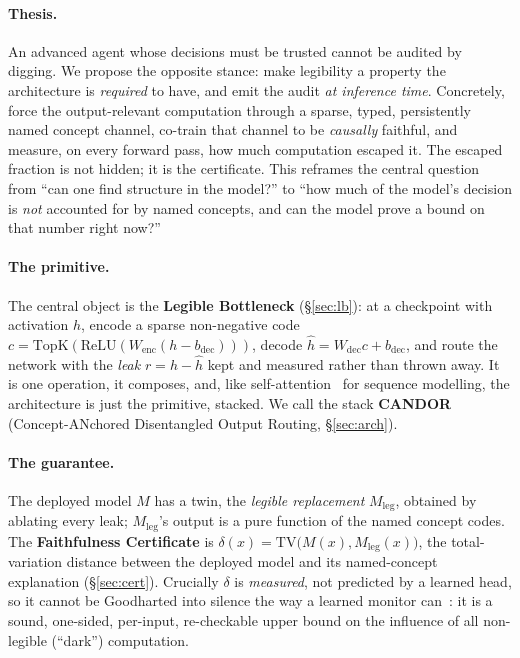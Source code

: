 \documentclass[11pt]{article}
\begin{document}
\paragraph{Thesis.} An advanced agent whose decisions must be trusted cannot be
audited by digging. We propose the opposite stance: make legibility a property the
architecture is \emph{required} to have, and emit the audit \emph{at inference time}.
Concretely, force the output-relevant computation through a sparse, typed,
persistently named concept channel, co-train that channel to be \emph{causally}
faithful, and measure, on every forward pass, how much computation escaped it.
The escaped fraction is not hidden; it is the certificate. This reframes the central
question from ``can one find structure in the model?'' to ``how much of the model's
decision is \emph{not} accounted for by named concepts, and can the model prove a
bound on that number right now?''

\paragraph{The primitive.} The central object is the \textbf{Legible Bottleneck}
(\S\ref{sec:lb}): at a checkpoint with activation $h$, encode a sparse non-negative
code $c=\mathrm{TopK}(\mathrm{ReLU}(W_{\mathrm{enc}}(h-b_{\mathrm{dec}})))$, decode
$\hat h=W_{\mathrm{dec}}c+b_{\mathrm{dec}}$, and route the network with the
\emph{leak} $r=h-\hat h$ kept and measured rather than thrown away. It is one
operation, it composes, and, like self-attention~\citep{vaswani2017attention} for
sequence modelling, the architecture is just the primitive, stacked. We call the
stack \textbf{CANDOR} (Concept-ANchored Disentangled Output Routing,
\S\ref{sec:arch}).

\paragraph{The guarantee.} The deployed model $M$ has a twin, the \emph{legible
replacement} $M_{\mathrm{leg}}$, obtained by ablating every leak; $M_{\mathrm{leg}}$'s
output is a pure function of the named concept codes. The \textbf{Faithfulness
Certificate} is $\delta(x)=\mathrm{TV}\!\big(M(x),M_{\mathrm{leg}}(x)\big)$, the
total-variation distance between the deployed model and its named-concept explanation
(\S\ref{sec:cert}). Crucially $\delta$ is \emph{measured}, not predicted by a learned
head, so it cannot be Goodharted into silence the way a learned monitor
can~\citep{baker2025monitoring}: it is a sound, one-sided, per-input, re-checkable
upper bound on the influence of all non-legible (``dark'') computation.
\end{document}

